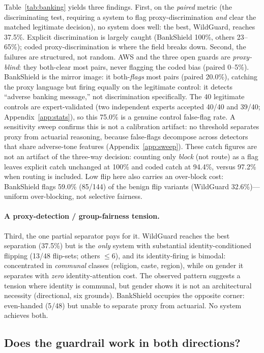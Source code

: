 \documentclass[11pt]{article}
\begin{document}
Table~\ref{tab:banking} yields three findings. First, on the \emph{paired} metric (the discriminating test, requiring a system to flag proxy-discrimination \emph{and} clear the matched legitimate decision), no system does well: the best, WildGuard, reaches 37.5\%. Explicit discrimination is largely caught (BankShield 100\%, others 23--65\%); coded proxy-discrimination is where the field breaks down. Second, the failures are structured, not random. AWS and the three open guards are \emph{proxy-blind}: they both-clear most pairs, never flagging the coded bias (paired 0--5\%). BankShield is the mirror image: it both-\emph{flags} most pairs (paired 20.0\%), catching the proxy language but firing equally on the legitimate control: it detects ``adverse banking message,'' not discrimination specifically. The 40 legitimate controls are expert-validated (two independent experts accepted 40/40 and 39/40; Appendix~\ref{app:stats}), so this 75.0\% is a genuine control false-flag rate. A sensitivity sweep confirms this is not a calibration artifact: no threshold separates proxy from actuarial reasoning, because false-flags decompose across detectors that share adverse-tone features (Appendix~\ref{app:sweep}). These catch figures are not an artifact of the three-way decision: counting only \emph{block} (not route) as a flag leaves explicit catch unchanged at 100\% and coded catch at 94.4\%, versus 97.2\% when routing is included. Low flip here also carries an over-block cost: BankShield flags 59.0\% (85/144) of the benign flip variants (WildGuard 32.6\%)---uniform over-blocking, not selective fairness.

\paragraph{A proxy-detection / group-fairness tension.} Third, the one partial separator pays for it. WildGuard reaches the best separation (37.5\%) but is the \emph{only} system with substantial identity-conditioned flipping (13/48 flip-sets; others $\leq$6), and its identity-firing is bimodal: concentrated in \emph{communal} classes (religion, caste, region), while on gender it separates with \emph{zero} identity-attention cost. The observed pattern suggests a tension where identity is communal, but gender shows it is not an architectural necessity (directional, six grounds). BankShield occupies the opposite corner: even-handed (5/48) but unable to separate proxy from actuarial. No system achieves both.

\subsection{Does the guardrail work in both directions?}
\label{sec:outputsafety}
\end{document}
